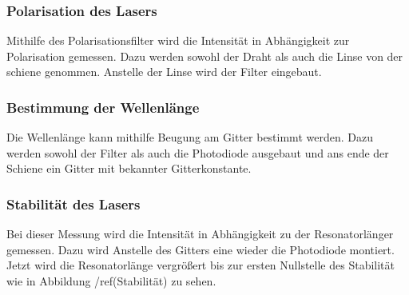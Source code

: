 \subsubsection{Polarisation des Lasers}
Mithilfe des Polarisationsfilter wird die Intensität in Abhängigkeit zur Polarisation gemessen. Dazu werden sowohl der Draht als auch die Linse von der schiene genommen. Anstelle der Linse wird der Filter eingebaut.
\subsubsection{Bestimmung der Wellenlänge}
Die Wellenlänge kann mithilfe Beugung am Gitter bestimmt werden. Dazu werden sowohl der Filter als auch die Photodiode ausgebaut und ans ende der Schiene ein Gitter mit bekannter Gitterkonstante.\\
\subsubsection{Stabilität des Lasers}
Bei dieser Messung wird die Intensität in Abhängigkeit zu der Resonatorlänger gemessen. Dazu wird Anstelle des Gitters eine wieder die Photodiode montiert. Jetzt wird die Resonatorlänge vergrößert bis zur ersten Nullstelle des Stabilität wie in Abbildung /ref(Stabilität) zu sehen.